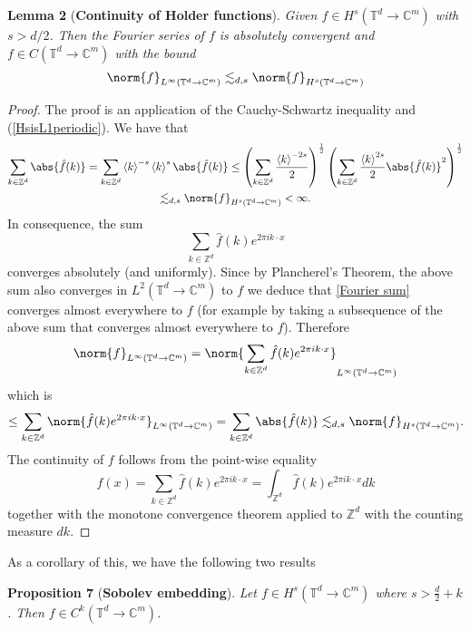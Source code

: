 \documentclass[
]{article}
\begin{document}
\textbf{Lemma 2} (\textbf{Continuity of Holder functions}). \emph{Given
\(f\in H^{s}({\mathbb T}^d\to\mathbb{C}^m)\) with \(s>d/2\). Then the
Fourier series of \(f\) is absolutely convergent and
\(f\in C({\mathbb T}^d\to\mathbb{C}^m)\) with the bound
\[\norm{f}_{L^\infty({\mathbb T}^d\to\mathbb{C}^m)}\lesssim_{d,s}\norm{f}_{H^s({\mathbb T}^d\to\mathbb{C}^m)}\]}

\emph{Proof.} The proof is an application of the Cauchy-Schwartz
inequality and
(\protect\hyperlink{HsisL1periodic}{{[}HsisL1periodic{]}}). We have that
\[\begin{gathered}
		\sum_{k\in{\mathbb Z}^d}\abs{\hat{f}(k)}=\sum_{k\in{\mathbb Z}^d} \left\langle k\right\rangle^{-s}\left\langle k\right\rangle^{s}\abs{\hat{f}(k)}\leq\left(\sum_{k\in{\mathbb Z}^d} \frac{\left\langle k\right\rangle^{-2s}}{2}\right)^{\frac{1}{2}}\left(\sum_{k\in{\mathbb Z}^d}\frac{\left\langle k\right\rangle^{2s}}{2}\abs{\hat{f}(k)}^2\right)^{\frac{1}{2}}\\
		\lesssim_{d,s}\norm{f}_{H^s(\mathbb{T}^d\to\mathbb{C}^m)}<\infty.
	\end{gathered}\] In consequence, the sum \[\label{Fourier sum}
	\sum_{k\in{\mathbb Z}^d}\hat{f}(k)e^{2\pi ik\cdot x}\] converges
absolutely (and uniformly). Since by Plancherel's Theorem, the above sum
also converges in \(L^2({\mathbb T}^d\to\mathbb{C}^m)\) to \(f\) we
deduce that \protect\hyperlink{Fourierux20sum}{{[}Fourier sum{]}}
converges almost everywhere to \(f\) (for example by taking a
subsequence of the above sum that converges almost everywhere to \(f\)).
Therefore
\[\norm{f}_{L^\infty({\mathbb T}^d\to\mathbb{C}^m)}=\norm{\sum_{k\in{\mathbb Z}^d}\hat{f}(k)e^{2\pi ik\cdot x}}_{L^\infty({\mathbb T}^d\to\mathbb{C}^m)}\]
which is
\[\leq\sum_{k\in{\mathbb Z}^d}\norm{\hat{f}(k)e^{2\pi ik\cdot x}}_{L^\infty({\mathbb T}^d\to\mathbb{C}^m)}=\sum_{k\in{\mathbb Z}^d}\abs{\hat{f}(k)}\lesssim_{d,s}\norm{f}_{H^s({\mathbb T}^d\to\mathbb{C}^m)}.\]
The continuity of \(f\) follows from the point-wise equality
\[\label{pointwise convergence Fourier sum}
	f(x)=\sum_{k\in{\mathbb Z}^d}\hat{f}(k)e^{2\pi ik\cdot x}=\int_{{\mathbb Z}^d} \hat{f}(k)e^{2\pi ik\cdot x} dk\]
together with the monotone convergence theorem applied to
\({\mathbb Z}^d\) with the counting measure \(dk\).~◻

As a corollary of this, we have the following two results

\leavevmode{}%
\textbf{Proposition 7} (\textbf{Sobolev embedding}). \emph{Let
	\(f\in H^s({\mathbb T}^d\to\mathbb{C}^m)\) where \(s>\frac{d}{2}+k\).
	Then \(f\in C^k({\mathbb T}^d\to\mathbb{C}^m)\).}
\end{document}
